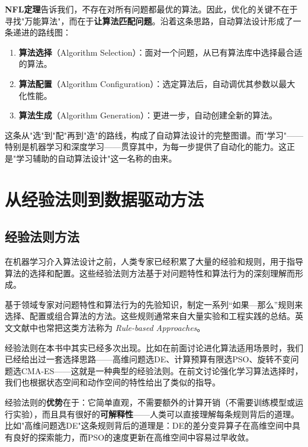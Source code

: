 \documentclass[lang=cn,zihao=-4,a4paper,fontset=windows]{beautybook}
\begin{document}
\begin{fancybox}
\textbf{NFL定理}告诉我们，不存在对所有问题都最优的算法。因此，优化的关键不在于寻找"万能算法"，而在于\textbf{让算法匹配问题}。沿着这条思路，自动算法设计形成了一条递进的路线图：
\begin{enumerate}
    \item \textbf{算法选择}（Algorithm Selection）：面对一个问题，从已有算法库中选择最合适的算法。
    \item \textbf{算法配置}（Algorithm Configuration）：选定算法后，自动调优其参数以最大化性能。
    \item \textbf{算法生成}（Algorithm Generation）：更进一步，自动创建全新的算法。
\end{enumerate}
这条从"选"到"配"再到"造"的路线，构成了自动算法设计的完整图谱。而"学习"——特别是机器学习和深度学习——贯穿其中，为每一步提供了自动化的能力。这正是"学习辅助的自动算法设计"这一名称的由来。
\end{fancybox}

\section{从经验法则到数据驱动方法}

\subsection{经验法则方法}

在机器学习介入算法设计之前，人类专家已经积累了大量的经验和规则，用于指导算法的选择和配置。这些经验法则方法基于对问题特性和算法行为的深刻理解而形成。

\begin{definition}[][经验法则方法]
基于领域专家对问题特性和算法行为的先验知识，制定一系列“如果—那么”规则来选择、配置或组合算法的方法。这些规则通常来自大量实验和工程实践的总结。英文文献中也常把这类方法称为 \textit{Rule-based Approaches}。
\end{definition}

经验法则在本书中其实已经多次出现。比如在前面讨论进化算法适用场景时，我们已经给出过一套选择思路——高维问题选DE、计算预算有限选PSO、旋转不变问题选CMA-ES——这就是一种典型的经验法则。在前文讨论强化学习算法选择时，我们也根据状态空间和动作空间的特性给出了类似的指导。

经验法则的\textbf{优势}在于：它简单直观，不需要额外的计算开销（不需要训练模型或运行实验），而且具有很好的\textbf{可解释性}——人类可以直接理解每条规则背后的道理。比如"高维问题选DE"这条规则背后的道理是：DE的差分变异算子在高维空间中具有良好的探索能力，而PSO的速度更新在高维空间中容易过早收敛。
\end{document}
